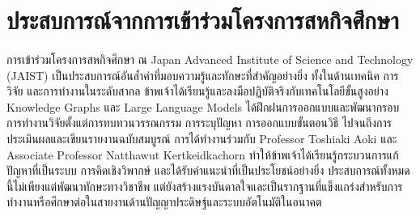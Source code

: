 \section{ประสบการณ์จากการเข้าร่วมโครงการสหกิจศึกษา}
\paragraph{}
การเข้าร่วมโครงการสหกิจศึกษา ณ Japan Advanced Institute of Science and Technology (JAIST) เป็นประสบการณ์อันล้ำค่าที่มอบความรู้และทักษะที่สำคัญอย่างยิ่ง ทั้งในด้านเทคนิค การวิจัย และการทำงานในระดับสากล ข้าพเจ้าได้เรียนรู้และลงมือปฏิบัติจริงกับเทคโนโลยีขั้นสูงอย่าง Knowledge Graphs และ Large Language Models ได้ฝึกฝนการออกแบบและพัฒนากรอบการทำงานวิจัยตั้งแต่การทบทวนวรรณกรรม การระบุปัญหา การออกแบบขั้นตอนวิธี ไปจนถึงการประเมินผลและเขียนรายงานฉบับสมบูรณ์ การได้ทำงานร่วมกับ Professor Toshiaki Aoki และ Associate Professor Natthawut Kertkeidkachorn ทำให้ข้าพเจ้าได้เรียนรู้กระบวนการแก้ปัญหาที่เป็นระบบ การคิดเชิงวิพากษ์ และได้รับคำแนะนำที่เป็นประโยชน์อย่างยิ่ง ประสบการณ์ทั้งหมดนี้ไม่เพียงแต่พัฒนาทักษะทางวิชาชีพ แต่ยังสร้างแรงบันดาลใจและเป็นรากฐานที่แข็งแกร่งสำหรับการทำงานหรือศึกษาต่อในสายงานด้านปัญญาประดิษฐ์และระบบอัตโนมัติในอนาคต